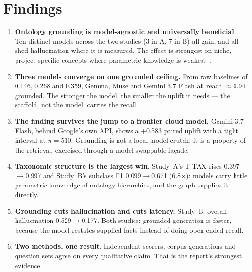 \documentclass[11pt]{article}
\begin{document}
\section{Findings}
\begin{samepage}
\begin{enumerate}[leftmargin=1.3em]
\item \textbf{Ontology grounding is model-agnostic and universally beneficial.} Ten distinct
      models across the two studies (3 in A, 7 in B) all gain, and all shed hallucination where it
      is measured. The effect is strongest on niche, project-specific concepts where parametric
      knowledge is weakest~\cite{lewis2020rag,liu2024chatqa}.

\item \textbf{Three models converge on one grounded ceiling.} From raw baselines of 0.146, 0.268
      and 0.359, Gemma, Muse and Gemini 3.7 Flash all reach $\approx$0.94 grounded. The stronger
      the model, the smaller the uplift it needs --- the scaffold, not the model, carries the
      recall.

\item \textbf{The finding survives the jump to a frontier cloud model.} Gemini 3.7 Flash, behind
      Google's own API, shows a +0.583 paired uplift with a tight interval at $n=510$. Grounding
      is not a local-model crutch; it is a property of the retrieval, exercised through a
      model-swappable façade.

\item \textbf{Taxonomic structure is the largest win.} Study~A's T-TAX rises 0.397$\to$0.997 and
      Study~B's subclass F1 0.099$\to$0.671 (6.8$\times$): models carry little parametric knowledge
      of ontology hierarchies, and the graph supplies it directly.

\item \textbf{Grounding cuts hallucination and cuts latency.} Study~B: overall hallucination
      0.529$\to$0.177. Both studies: grounded generation is faster, because the model restates
      supplied facts instead of doing open-ended recall.

\item \textbf{Two methods, one result.} Independent scorers, corpus generations and question sets
      agree on every qualitative claim. That is the report's strongest evidence.
\end{enumerate}
\end{samepage}
\end{document}
